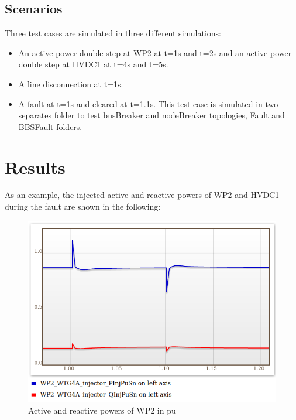 \documentclass[a4paper, 12pt]{report}
\begin{document}
\subsection{Scenarios}

\par Three test cases are simulated in three different simulations:

\begin{itemize}
\item An active power double step at WP2 at t=1s and t=2s and an active power double step at HVDC1 at t=4s and t=5s.
\item A line disconnection at t=1s.
\item A fault at t=1s and cleared at t=1.1s. This test case is simulated in two separates folder to test busBreaker and nodeBreaker topologies, Fault and BBSFault folders.
\end{itemize}

\section{Results}

\par As an example, the injected active and reactive powers of WP2 and HVDC1 during the fault are shown in the following:

\begin{figure}[H]
  \includegraphics[width=\textwidth]{PQWP2.png}
  \caption{Active and reactive powers of WP2 in pu}
\end{figure}
\end{document}
